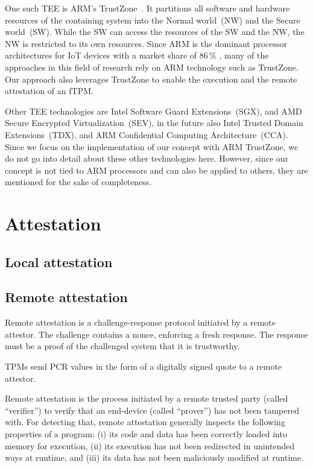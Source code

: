 One such \ac{TEE} is ARM's TrustZone~\cite{ARM09}. It partitions all software and hardware resources of the containing system into the Normal world~(NW) and the Secure world~(SW).
While the SW can access the resources of the SW and the NW, the NW is restricted to its own resources.
Since ARM is the dominant processor architectures for IoT devices with a market share of 86\,\% \cite{eclipse}, many of the approaches in this field of research rely on ARM technology such as TrustZone.
Our approach also leverages TrustZone to enable the execution and the remote attestation of an fTPM.

Other \ac{TEE} technologies are Intel Software Guard Extensions~(SGX), and AMD Secure Encrypted Virtualization~(SEV), in the future also Intel Trusted Domain Extensions~(TDX), and ARM Confidential Computing Architecture~(CCA). Since we focus on the implementation of our concept with ARM TrustZone, we do not go into detail about these other technologies here. However, since our concept is not tied to ARM processors and can also be applied to others, they are mentioned for the sake of completeness.




\section{Attestation}
\subsection{Local attestation}
\subsection{Remote attestation}

Remote attestation is a challenge-response protocol initiated by a remote attestor.
The challenge contains a nonce, enforcing a fresh response.
The response must be a proof of the challenged system that it is trustworthy.

TPMs send \ac{PCR} values in the form of a digitally signed quote to a remote attestor.

Remote attestation is the process initiated by a remote trusted party (called ``verifier'') to verify that an end-device (called ``prover'') has not been tampered with. For detecting that, remote attestation generally inspects the following properties of a program: (i) its code and data has been correctly loaded into memory for execution, (ii) its execution has not been redirected in unintended ways at runtime, and (iii) its data has not been maliciously modified at runtime.

